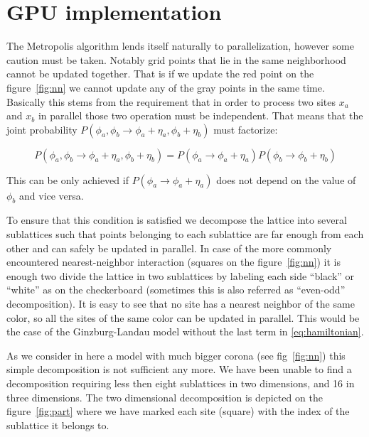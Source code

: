 \documentclass[a4paper]{llncs}
\begin{document}
\section{GPU implementation}

The Metropolis algorithm lends itself naturally to parallelization, however
some caution must be taken. Notably grid points that lie in the same
neighborhood cannot be updated together. That is if we update the red point on
the figure~\ref{fig:nn} we cannot update any of the gray points in the same
time. Basically this stems from the requirement that in order to process two
sites $x_a$ and $x_b$ in parallel those two operation must be independent. That
means that the joint probability
$P(\phi_a,\phi_b\rightarrow\phi_a+\eta_a,\phi_b+\eta_b)$ must factorize:

\begin{equation}
P(\phi_a,\phi_b\rightarrow\phi_a+\eta_a,\phi_b+\eta_b)
=P(\phi_a\rightarrow\phi_a+\eta_a)P(\phi_b\rightarrow\phi_b+\eta_b)
\end{equation}

This can be only achieved if $P(\phi_a\rightarrow\phi_a+\eta_a)$ does
not depend on the value of $\phi_b$ and vice versa.

To ensure that this condition is satisfied we decompose the lattice into
several sublattices such that points belonging to each sublattice are far
enough from each other and can safely be updated in parallel. In case of the
more commonly encountered nearest-neighbor interaction (squares on the
figure~\ref{fig:nn}) it is enough two divide the lattice in two sublattices by
labeling each side ``black'' or ``white'' as on the checkerboard (sometimes
this is also referred as ``even-odd'' decomposition)\cite{Checkboard}. It is
easy to see that no site has a nearest neighbor of the same color, so all the
sites of the same color can be updated in parallel. This would be the case of
the Ginzburg-Landau model without the last term in \eqref{eq:hamiltonian}.

As we consider in here a model with much bigger corona (see fig~\ref{fig:nn})
this simple decomposition is not sufficient any more. We have been unable to
find a decomposition requiring less then eight sublattices in two dimensions,
and 16 in three dimensions. The two dimensional decomposition is depicted on
the figure~\ref{fig:part} where we have marked each site (square) with the
index of the sublattice it belongs to.
\end{document}
